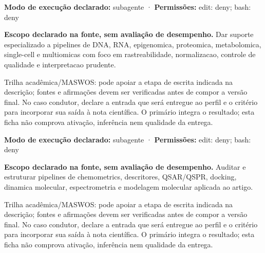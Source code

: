 \begin{arquitetura}
\textbf{Modo de execução declarado:} subagente · \textbf{Permissões:} edit: deny; bash: deny
\end{arquitetura}


\begin{descricao}
\textbf{Escopo declarado na fonte, sem avaliação de desempenho.}
Dar suporte especializado a pipelines de DNA, RNA, epigenomica, proteomica, metabolomica, single-cell e multiomicas com foco em rastreabilidade, normalizacao, controle de qualidade e interpretacao prudente.
\end{descricao}

\begin{funcao}
Trilha acadêmica/MASWOS: pode apoiar a etapa de escrita indicada na descrição; fontes e afirmações devem ser verificadas antes de compor a versão final. No caso condutor, declare a entrada que será entregue ao perfil e o critério para incorporar sua saída à nota científica. O primário integra o resultado; esta ficha não comprova ativação, inferência nem qualidade da entrega.
\end{funcao}

\begin{arquitetura}
\textbf{Modo de execução declarado:} subagente · \textbf{Permissões:} edit: deny; bash: deny
\end{arquitetura}


\begin{descricao}
\textbf{Escopo declarado na fonte, sem avaliação de desempenho.}
Auditar e estruturar pipelines de chemometrics, descritores, QSAR/QSPR, docking, dinamica molecular, espectrometria e modelagem molecular aplicada ao artigo.
\end{descricao}

\begin{funcao}
Trilha acadêmica/MASWOS: pode apoiar a etapa de escrita indicada na descrição; fontes e afirmações devem ser verificadas antes de compor a versão final. No caso condutor, declare a entrada que será entregue ao perfil e o critério para incorporar sua saída à nota científica. O primário integra o resultado; esta ficha não comprova ativação, inferência nem qualidade da entrega.
\end{funcao}

